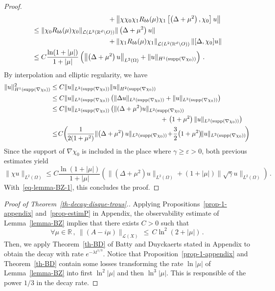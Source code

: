 \documentclass[AHL,Unicode,longabstracts]{cedram}
\newcommand{\RR}{\mathbb{R}}
\newcommand{\Lc}{\mathcal{L}}
\newcommand{\grad}{\nabla}
\let\oldforall\forall
\renewcommand*{\forall}{\mathrel{\oldforall}}
\begin{document}
\begin{proof}
\begin{align*}
&\mkern200mu+ \left\|\chi\chi_0\chi_1 R_{bb}(\mu)\chi_1 \left[\left(\Delta+\mu^2\right),\chi_0\right] u\right\|\\
&\leq \|\chi_0 R_{bb}(\mu)\chi_0\|_{\Lc\left(L^2(\RR^d\setminus O)\right)}\|\left(\Delta+\mu^2\right) u\|\\
&\mkern200mu + \left\|\chi_1 R_{bb}(\mu)\chi_1\right\|_{\Lc\left(L^2(\RR^d\setminus O)\right)}
\|[\Delta,\chi_0] u\|\\
&\leq C \frac {\ln (1+|\mu|)}{1+|\mu|}\left(\left\|\left(\Delta+\mu^2\right) u\right\|_{L^2(\Omega)} + \|u\|_{H^1(\text{supp}(\grad \chi_0))}\right)\,.
\end{align*}
By interpolation and elliptic regularity, we have
\begin{align*}
\|u\|^2_{H^1(\text{supp}(\grad \chi_0))} & \leq C \|u\|_{L^2(\text{supp}(\grad
\chi_0))} \|u\|_{H^2(\text{supp}(\grad \chi_0))}\\
&\leq C \|u\|_{L^2(\text{supp}(\grad \chi_0))}\left(\|\Delta u\|_{L^2(\text{supp}(\grad \chi_0))} + \|u\|_{L^2(\text{supp}(\grad
\chi_0))}\right)\\
&\leq C \|u\|_{L^2(\text{supp}(\grad
\chi_0))}\left(\|(\Delta+\mu^2)u\|_{L^2(\text{supp}(\grad \chi_0))}\right.\\
& \mkern305mu + \left.\left(1+\mu^2\right)\|u\|_{L^2(\text{supp}(\grad \chi_0))}\right)\\
& \leq\!C\!\left(\!\frac 1{2(1+\mu^2)}\|\!\left(\Delta+\mu^2\right)u\|_{L^2(\text{supp}(\grad
\chi_0))}\! +\!
\frac 32\!\left(1+\mu^2\right)\!\!\|u\|_{L^2(\text{supp}(\grad \chi_0))}\!\right)
\end{align*}
Since the support of $\grad\chi_0$ is included in the place where $\gamma\geq
\varepsilon >0$, both previous estimates yield
\[
\|\chi u\|_{L^2(\Omega)} \leq C \frac {\ln (1+|\mu|)}{1+|\mu|}\left(
\|\left(\Delta+\mu^2\right) u\|_{L^2(\Omega)}
+ (1+|\mu|)\|\sqrt \gamma u\|_{L^2(\Omega)}\right)\,.
\]
With~\eqref{eq-lemma-BZ-1}, this concludes the proof.
\end{proof}

\begin{proof}[{Proof of Theorem~\ref{th-decay-disque-trous}.}] Applying Propositions~\ref{prop-1-appendix} and~\ref{prop-estimP} in Appendix, the observability estimate of Lemma~\ref{lemma-BZ} implies that there exists $C>0$ such that
\[
\forall \mu\in\RR\,,\:\|(A-i\mu)\|_{\Lc(X)}\,\leq\,C \ln^2(2+|\mu|)\,.
\]
Then, we apply Theorem~\ref{th-BD} of Batty and Duyckaerts stated in Appendix to obtain the decay with rate $e^{-\lambda t^{1/3}}$. Notice that Proposition~\ref{prop-1-appendix} and Theorem~\ref{th-BD} contain some losses transforming the rate $\ln |\mu|$ of Lemma~\ref{lemma-BZ} into first $\ln^2 |\mu|$ and then $\ln^3 |\mu|$. This is responsible of the power $1/3$ in the decay rate.
\end{proof}
\end{document}

